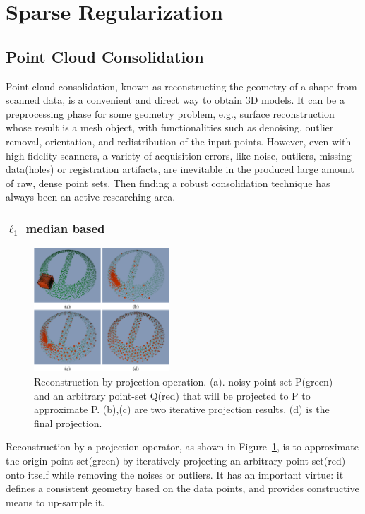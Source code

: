 \section{Sparse Regularization}
\label{sec:Sparse Regularization}


\subsection{Point Cloud Consolidation}
\label{subsec:Point Cloud Consolidation}

Point cloud consolidation, known as reconstructing the geometry of a shape from scanned data, is a convenient and direct way to obtain 3D models.
It can be a preprocessing phase for some geometry problem, e.g., surface reconstruction whose result is a mesh object, with functionalities such as denoising, outlier removal, orientation, and redistribution of the input points.
However, even with high-fidelity scanners, a variety of acquisition errors, like noise, outliers, missing data(holes) or registration artifacts, are inevitable in the produced large amount of raw, dense point sets.
Then finding a robust consolidation technique has always been an active researching area.

\subsubsection{$\ell_1$ median based}
\label{subsubsec:l1 median based}

\begin{figure}[ht]
  \centering
  \includegraphics[width=2.0in]{images/L1median}
  \caption{Reconstruction by projection operation. (a). noisy point-set P(green) and an arbitrary point-set Q(red) that will be projected to P to approximate P. (b),(c) are two iterative projection results. (d) is the final projection.}
  \label{fig:L1 median}
\end{figure}

Reconstruction by a projection operator, as shown in Figure~\ref{fig:L1 median}, is to approximate the origin point set(green) by iteratively projecting an arbitrary point set(red) onto itself while removing the noises or outliers.
It has an important virtue: it defines a consistent geometry based on the data points, and provides constructive means to up-sample it.

